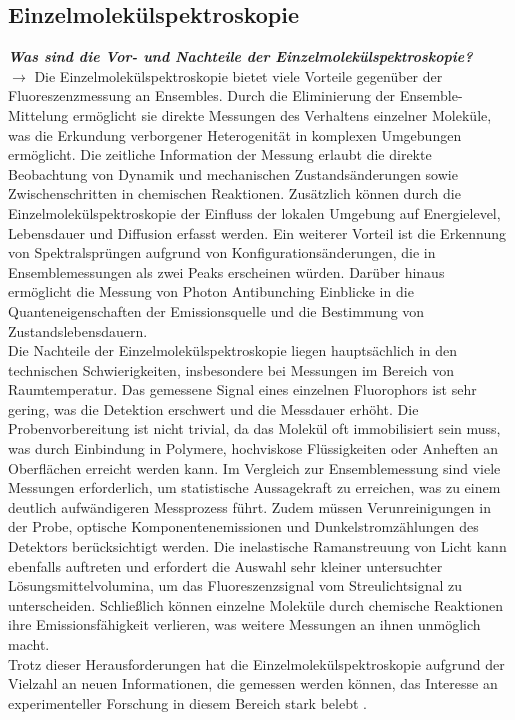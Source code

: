 \subsection{\label{subsec:FZV5}Einzelmolekülspektroskopie}
\textbf{\textit{Was sind die Vor- und Nachteile der Einzelmolekülspektroskopie?}} \\
$\rightarrow$
Die Einzelmolekülspektroskopie bietet viele Vorteile gegenüber der Fluoreszenzmessung an 
Ensembles. Durch die Eliminierung der Ensemble-Mittelung ermöglicht sie direkte Messungen 
des Verhaltens einzelner Moleküle, was die Erkundung verborgener Heterogenität in komplexen 
Umgebungen ermöglicht. Die zeitliche Information der Messung erlaubt die direkte Beobachtung 
von Dynamik und mechanischen Zustandsänderungen sowie Zwischenschritten in chemischen 
Reaktionen. Zusätzlich können durch die Einzelmolekülspektroskopie der Einfluss der lokalen 
Umgebung auf Energielevel, Lebensdauer und Diffusion erfasst werden. Ein weiterer Vorteil 
ist die Erkennung von Spektralsprüngen aufgrund von Konfigurationsänderungen, die in 
Ensemblemessungen als zwei Peaks erscheinen würden. Darüber hinaus ermöglicht die Messung 
von Photon Antibunching Einblicke in die Quanteneigenschaften der Emissionsquelle und die 
Bestimmung von Zustandslebensdauern. \\
Die Nachteile der Einzelmolekülspektroskopie liegen hauptsächlich in den technischen Schwierigkeiten, 
insbesondere bei Messungen im Bereich von Raumtemperatur. Das gemessene Signal eines einzelnen 
Fluorophors ist sehr gering, was die Detektion erschwert und die Messdauer erhöht. 
Die Probenvorbereitung ist nicht trivial, da das Molekül oft immobilisiert sein muss, was durch 
Einbindung in Polymere, hochviskose Flüssigkeiten oder Anheften an Oberflächen erreicht werden kann. 
Im Vergleich zur Ensemblemessung sind viele Messungen erforderlich, um statistische Aussagekraft 
zu erreichen, was zu einem deutlich aufwändigeren Messprozess führt. Zudem müssen Verunreinigungen 
in der Probe, optische Komponentenemissionen und Dunkelstromzählungen des Detektors berücksichtigt 
werden. Die inelastische Ramanstreuung von Licht kann ebenfalls auftreten und erfordert die Auswahl 
sehr kleiner untersuchter Lösungsmittelvolumina, um das Fluoreszenzsignal vom Streulichtsignal 
zu unterscheiden. Schließlich können einzelne Moleküle durch chemische Reaktionen ihre 
Emissionsfähigkeit verlieren, was weitere Messungen an ihnen unmöglich macht. \\
Trotz dieser Herausforderungen hat die Einzelmolekülspektroskopie aufgrund der Vielzahl an neuen 
Informationen, die gemessen werden können, das Interesse an experimenteller Forschung in diesem 
Bereich stark belebt \cite{EPC, P1, P2, SingEns, Prinzip}. \\